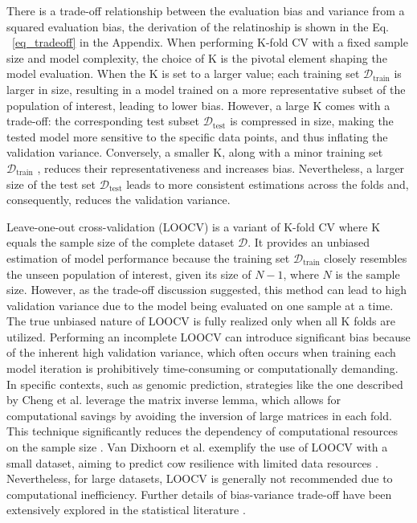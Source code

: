 There is a trade-off relationship between the evaluation bias and variance from a squared evaluation bias, the derivation of the relatinoship is shown in the Eq. ~\ref{eq_tradeoff} in the Appendix. When performing K-fold CV with a fixed sample size and model complexity, the choice of K is the pivotal element shaping the model evaluation. When the K is set to a larger value; each training set $\mathcal{D}_\text{train}$ is larger in size, resulting in a model trained on a more representative subset of the population of interest, leading to lower bias. However, a large K comes with a trade-off: the corresponding test subset $\mathcal{D}_\text{test}$ is compressed in size, making the tested model more sensitive to the specific data points, and thus inflating the validation variance. Conversely, a smaller K, along with a minor training set $\mathcal{D}_\text{train}$ , reduces their representativeness and increases bias. Nevertheless, a larger size of the test set $\mathcal{D}_\text{test}$ leads to more consistent estimations across the folds and, consequently, reduces the validation variance.

Leave-one-out cross-validation (LOOCV) is a variant of K-fold CV where K equals the sample size of the complete dataset $\mathcal{D}$. It provides an unbiased estimation of model performance because the training set $\mathcal{D}_\text{train}$ closely resembles the unseen population of interest, given its size of $N - 1$, where $N$ is the sample size. However, as the trade-off discussion suggested, this method can lead to high validation variance due to the model being evaluated on one sample at a time. The true unbiased nature of LOOCV is fully realized only when all K folds are utilized. Performing an incomplete LOOCV can introduce significant bias because of the inherent high validation variance, which often occurs when training each model iteration is prohibitively time-consuming or computationally demanding. In specific contexts, such as genomic prediction, strategies like the one described by Cheng et al. leverage the matrix inverse lemma, which allows for computational savings by avoiding the inversion of large matrices in each fold. This technique significantly reduces the dependency of computational resources on the sample size \citep{cheng_efficient_2017}. Van Dixhoorn et al. exemplify the use of LOOCV with a small dataset, aiming to predict cow resilience with limited data resources \citep{van_dixhoorn_indicators_2018}. Nevertheless, for large datasets, LOOCV is generally not recommended due to computational inefficiency. Further details of bias-variance trade-off have been extensively explored in the statistical literature \citep{hastie_elements_2009, cawley_over-fitting_2010}.

